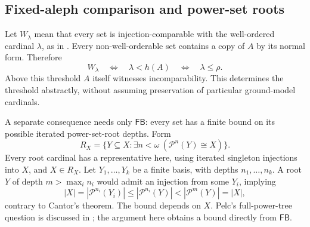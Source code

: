 \documentclass[11pt,a4paper]{article}
\newcommand{\FB}{\mathsf{FB}}
\newcommand{\calP}{\mathcal P}
\theoremstyle{definition}
\theoremstyle{remark}
\begin{document}
\subsection{Fixed-aleph comparison and power-set roots}
Let $W_\lambda$ mean that every set is injection-comparable with the well-ordered cardinal $\lambda$, as in \cite[Section 3.5]{RyanSmith}. Every non-well-orderable set contains a copy of $A$ by its normal form. Therefore
\[
 W_\lambda\quad\Longleftrightarrow\quad\lambda<h(A)
 \quad\Longleftrightarrow\quad\lambda\le\rho.
\]
Above this threshold $A$ itself witnesses incomparability. This determines the threshold abstractly, without assuming preservation of particular ground-model cardinals.

A separate consequence needs only $\FB$: every set has a finite bound on its possible iterated power-set-root depths. Form
\[
 R_X=\{Y\subseteq X:\exists n<\omega\ (\calP^n(Y)\cong X)\}.
\]
Every root cardinal has a representative here, using iterated singleton injections into $X$, and $X\in R_X$. Let $Y_1,\ldots,Y_k$ be a finite basis, with depths $n_1,\ldots,n_k$. A root $Y$ of depth $m>\max_i n_i$ would admit an injection from some $Y_i$, implying
\[
 |X|=|\calP^{n_i}(Y_i)|\le|\calP^{n_i}(Y)|
       <|\calP^m(Y)|=|X|,
\]
contrary to Cantor's theorem. The bound depends on $X$. Pelc's full-power-tree question is discussed in \cite[Theorem 10.9]{BK}; the argument here obtains a bound directly from $\FB$.
\end{document}
